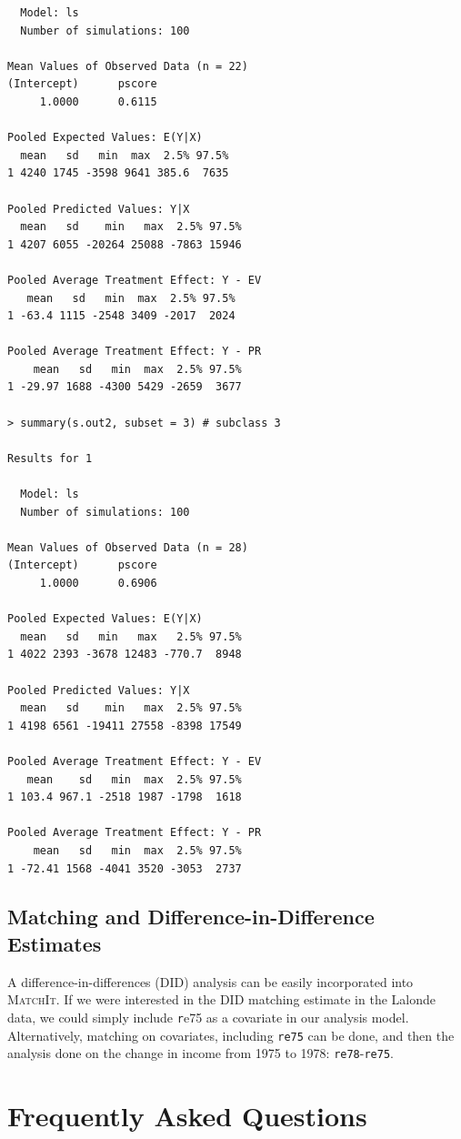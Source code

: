 \documentclass[oneside,letterpaper,titlepage]{article}
\newcommand{\MatchIt}{\textsc{MatchIt}}
\begin{document}
\begin{verbatim}
  Model: ls 
  Number of simulations: 100 

Mean Values of Observed Data (n = 22) 
(Intercept)      pscore 
     1.0000      0.6115 

Pooled Expected Values: E(Y|X)
  mean   sd   min  max  2.5% 97.5%
1 4240 1745 -3598 9641 385.6  7635

Pooled Predicted Values: Y|X
  mean   sd    min   max  2.5% 97.5%
1 4207 6055 -20264 25088 -7863 15946

Pooled Average Treatment Effect: Y - EV
   mean   sd   min  max  2.5% 97.5%
1 -63.4 1115 -2548 3409 -2017  2024

Pooled Average Treatment Effect: Y - PR
    mean   sd   min  max  2.5% 97.5%
1 -29.97 1688 -4300 5429 -2659  3677

> summary(s.out2, subset = 3) # subclass 3

Results for 1 

  Model: ls 
  Number of simulations: 100 

Mean Values of Observed Data (n = 28) 
(Intercept)      pscore 
     1.0000      0.6906 

Pooled Expected Values: E(Y|X)
  mean   sd   min   max   2.5% 97.5%
1 4022 2393 -3678 12483 -770.7  8948

Pooled Predicted Values: Y|X
  mean   sd    min   max  2.5% 97.5%
1 4198 6561 -19411 27558 -8398 17549

Pooled Average Treatment Effect: Y - EV
   mean    sd   min  max  2.5% 97.5%
1 103.4 967.1 -2518 1987 -1798  1618

Pooled Average Treatment Effect: Y - PR
    mean   sd   min  max  2.5% 97.5%
1 -72.41 1568 -4041 3520 -3053  2737

\end{verbatim}

\subsection{Matching and Difference-in-Difference Estimates}
A difference-in-differences (DID) analysis can be easily incorporated
into \MatchIt.  If we were interested in the DID matching estimate in
the Lalonde data, we could simply include {\texttt re75} as a
covariate in our analysis model.  Alternatively, matching on
covariates, including {\tt re75} can be done, and then the analysis
done on the change in income from 1975 to 1978: {\tt re78}-{\tt re75}.

\section{Frequently Asked Questions}
\end{document}
